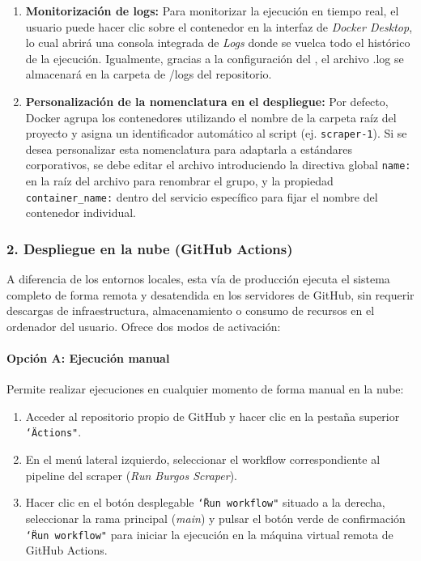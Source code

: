 \begin{enumerate}
    \item \textbf{Monitorización de logs:} Para monitorizar la ejecución en tiempo real, el usuario puede hacer clic sobre el contenedor en la interfaz de \textit{Docker Desktop}, lo cual abrirá una consola integrada de \textit{Logs} donde se vuelca todo el histórico de la ejecución. Igualmente, gracias a la configuración del , el archivo .log se almacenará en la carpeta de /logs del repositorio. 
    
    \item \textbf{Personalización de la nomenclatura en el despliegue:} Por defecto, Docker agrupa los contenedores utilizando el nombre de la carpeta raíz del proyecto y asigna un identificador automático al script (ej. \texttt{scraper-1}). Si se desea personalizar esta nomenclatura para adaptarla a estándares corporativos, se debe editar el archivo  introduciendo la directiva global \texttt{name:} en la raíz del archivo para renombrar el grupo, y la propiedad \texttt{container\_name:} dentro del servicio específico para fijar el nombre del contenedor individual.
\end{enumerate}

\subsubsection{2. Despliegue en la nube (GitHub Actions)}
A diferencia de los entornos locales, esta vía de producción ejecuta el sistema completo de forma remota y desatendida en los servidores de GitHub, sin requerir descargas de infraestructura, almacenamiento o consumo de recursos en el ordenador del usuario. Ofrece dos modos de activación:

\paragraph{Opción A: Ejecución manual}
Permite realizar ejecuciones en cualquier momento de forma manual en la nube:
\begin{enumerate}
    \item Acceder al repositorio propio de GitHub y hacer clic en la pestaña superior \texttt{\char`\"Actions"}.
    \item En el menú lateral izquierdo, seleccionar el workflow correspondiente al pipeline del scraper (\textit{Run Burgos Scraper}).
    \item Hacer clic en el botón desplegable \texttt{\char`\"Run workflow"} situado a la derecha, seleccionar la rama principal (\textit{main}) y pulsar el botón verde de confirmación \texttt{\char`\"Run workflow"} para iniciar la ejecución en la máquina virtual remota de GitHub Actions.
\end{enumerate}


